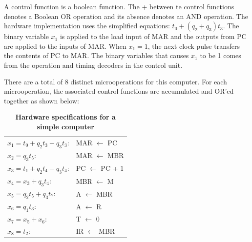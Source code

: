 \documentclass{book}
\begin{document}
A control function is a boolean function. The + between te control functions denotes a Boolean OR operation and its absence denotes an AND operation. The hardware implementation uses the simplified equations: $t_0 + (q_2 + q_3)t_3$. The binary variable $x_1$ is applied to the load input of MAR and the outputs from PC are applied to the inputs of MAR. When $x_1 = 1$, the next clock pulse transfers the contents of PC to MAR. The binary variables that causes $x_1$ to be 1 comes from the operation and timing decoders in the control unit.

There are a total of 8 distinct microoperations for this computer. For each microoperation, the associated control functions are accumulated and OR'ed together as shown below:

\begin{table}[h,c]

\begin{center}
 \begin{tabular}{l  l}
  \hline
  $x_1 = t_0 + q_2t_3 + q_3t_3$: & MAR $\leftarrow$ PC\\
  $x_2 = q_3t_5$: & MAR $\leftarrow$ MBR\\
  $x_3 = t_1 + q_2t_4 + q_3t_4$: & PC $\leftarrow$ PC + 1\\
  $x_4 = x_3 + q_3t_4$: & MBR $\leftarrow$ M\\
  $x_5 = q_2t_5 + q_3t_7$: & A $\leftarrow$ MBR\\
  $x_6 = q_1t_3$: & A $\leftarrow$ R\\
  $x_7 = x_5 + x_6$: & T $\leftarrow$ 0\\
  $x_8 = t_2$: & IR $\leftarrow$ MBR\\
  
	
  \hline
  \end{tabular}
  \caption{\textbf{Hardware specifications for a simple computer}}
  \label{control_design}
 \end{center}
\end{table}
\end{document}
